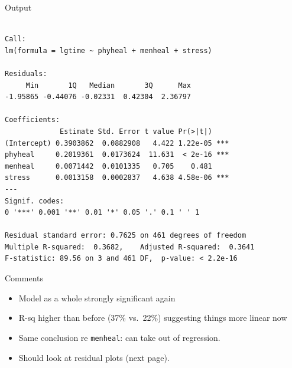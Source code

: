 \begin{frame}[fragile]{Output}

{\scriptsize
 
\begin{knitrout}
\color{fgcolor}\begin{kframe}
\begin{alltt}
\end{alltt}
\begin{verbatim}

Call:
lm(formula = lgtime ~ phyheal + menheal + stress)

Residuals:
     Min       1Q   Median       3Q      Max 
-1.95865 -0.44076 -0.02331  0.42304  2.36797 

Coefficients:
             Estimate Std. Error t value Pr(>|t|)    
(Intercept) 0.3903862  0.0882908   4.422 1.22e-05 ***
phyheal     0.2019361  0.0173624  11.631  < 2e-16 ***
menheal     0.0071442  0.0101335   0.705    0.481    
stress      0.0013158  0.0002837   4.638 4.58e-06 ***
---
Signif. codes:  
0 '***' 0.001 '**' 0.01 '*' 0.05 '.' 0.1 ' ' 1

Residual standard error: 0.7625 on 461 degrees of freedom
Multiple R-squared:  0.3682,	Adjusted R-squared:  0.3641 
F-statistic: 89.56 on 3 and 461 DF,  p-value: < 2.2e-16
\end{verbatim}
\end{kframe}
\end{knitrout}
}
 
\end{frame}

\begin{frame}[fragile]{Comments}

  \begin{itemize}
  \item Model as a whole strongly significant again 
  \item R-sq higher than before (37\% vs.\ 22\%) suggesting things more linear now
  \item Same conclusion re \verb-menheal-: can take out of regression.
  \item Should look at residual plots (next page).
  \end{itemize}
  
\end{frame}

